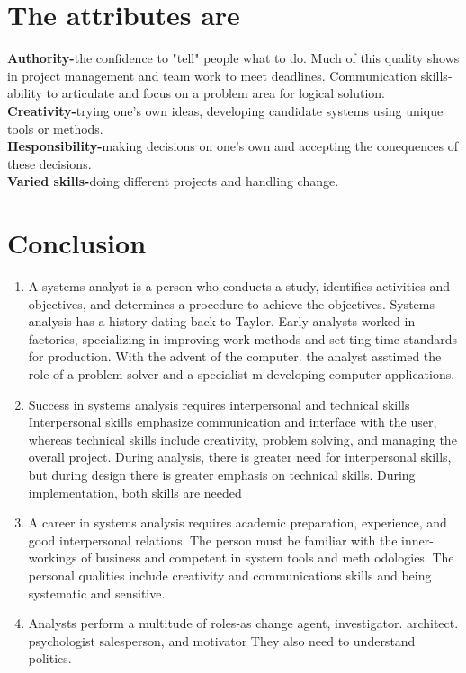 \documentclass[a4paper,12pt]{report}
\begin{document}
\section{The attributes are}
\textbf{Authority-}the confidence to "tell" people what to do. Much of this quality shows in project management and team work to meet deadlines. Communication skills-ability to articulate and focus on a problem area for logical solution.\\
\textbf{Creativity-}trying one's own ideas, developing candidate systems using unique tools or methods.\\
\textbf{Hesponsibility-}making decisions on one's own and accepting the conequences of these decisions.\\
\textbf{Varied skills-}doing different projects and handling change.
\section{Conclusion}
\begin{enumerate}
	\item  A systems analyst is a person who conducts a study, identifies activities and objectives, and determines a procedure to achieve the objectives. Systems analysis has a history dating back to Taylor. Early analysts worked in factories, specializing in improving work methods and set ting time standards for production. With the advent of the computer. the analyst asstimed the role of a problem solver and a specialist m developing computer applications.
	\item Success in systems analysis requires interpersonal and technical skills Interpersonal skills emphasize communication and interface with the user, whereas technical skills include creativity, problem solving, and managing the overall project. During analysis, there is greater need for interpersonal skills, but during design there is greater emphasis on technical skills. During implementation, both skills are needed
	\item A career in systems analysis requires academic preparation, experience, and good interpersonal relations. The person must be familiar with the inner-workings of business and competent in system tools and meth odologies. The personal qualities include creativity and communications skills and being systematic and sensitive.
	\item Analysts perform a multitude of roles-as change agent, investigator. architect. psychologist salesperson, and motivator They also need to understand politics.
\end{enumerate}
\end{document}
